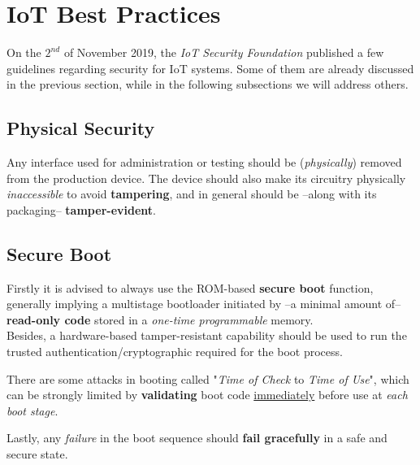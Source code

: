 \section{IoT Best Practices}
On the $2^{nd}$ of November 2019,
the \textit{IoT Security Foundation} published a few guidelines regarding security for IoT systems.
Some of them are already discussed in the previous section, while in the following subsections we will address others.
\subsection{Physical Security}

Any interface used for administration  or testing should be (\textit{physically}) removed from the production device. 
The device should also make its circuitry physically \textit{inaccessible} to avoid \textbf{tampering},
and in general should be {--}along with its packaging{--} \textbf{tamper-evident}.  

\subsection{Secure Boot}
Firstly it is advised to always use the ROM-based \textbf{secure boot} function, generally implying a multistage bootloader initiated by {--}a minimal amount of{--} \textbf{read-only code} stored in a \textit{one-time programmable} memory.\\
Besides, a hardware-based tamper-resistant capability should be used to run the trusted authentication/cryptographic required for the boot process.

There are some attacks in booting called "\textit{Time of Check} to \textit{Time of Use}", which can be strongly limited by \textbf{validating} boot code \underline{immediately} before use at \textit{each boot stage}.

Lastly, any \textit{failure} in the boot sequence should \textbf{fail gracefully} in a safe and secure state.

